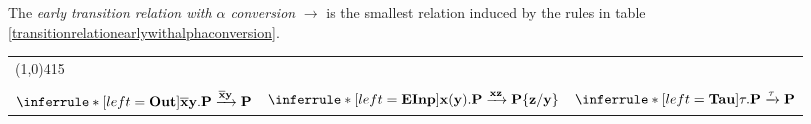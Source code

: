 \begin{definition}
  The \emph{early transition relation with $\alpha$ conversion} $\rightarrow$ is the smallest relation induced by the rules in table \ref{transitionrelationearlywithalphaconversion}.

  \begin{table}
    \begin{tabular}{lll}  
      	\multicolumn{3}{l}{\line(1,0){415}}\\\\
	  $\inferrule* [left=\bf{Out}]{
	  }{
	    \overline{x}y.P \xrightarrow{\overline{x}y} P
	  }$
	&
	  $\inferrule* [left=\bf{EInp}]{
	  }{
	    x(y).P \xrightarrow{xz} P\{z/y\}
	  }$
	&
	  $\inferrule* [left=\bf{Tau}]{
	  }{
	    \tau.P \xrightarrow{\tau} P
	  }$
      \\
    \end{tabular}
    \\
\end{table}
\end{definition}
